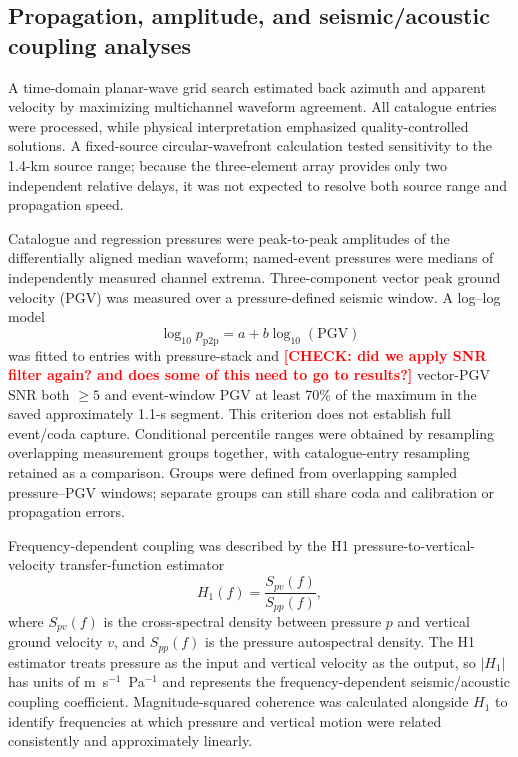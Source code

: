 \documentclass[]{seismica}
\newcommand{\checkme}[1]{\textcolor{red}{\textbf{[CHECK: #1]}}}
\begin{document}
\subsection{Propagation, amplitude, and seismic/acoustic coupling analyses}

A time-domain planar-wave grid search estimated back azimuth and apparent
velocity by maximizing multichannel waveform agreement. All catalogue entries
were processed, while physical interpretation emphasized quality-controlled
solutions. A fixed-source circular-wavefront calculation tested sensitivity to
the 1.4-km source range; because the three-element array provides only two
independent relative delays, it was not expected to resolve both source range
and propagation speed.

Catalogue and regression pressures were peak-to-peak amplitudes of the
differentially aligned median waveform; named-event pressures were medians
of independently measured channel extrema. Three-component vector peak ground
velocity (PGV) was measured over a pressure-defined seismic window. A log--log model
\begin{equation}
 \log_{10}p_{\mathrm{p2p}}=a+b\log_{10}(\mathrm{PGV})
 \label{eq:power_law}
\end{equation}
was fitted to entries with pressure-stack and \checkme{did we apply SNR filter again? and does some of this need to go to results?}
vector-PGV SNR both $\geq5$
and event-window PGV at least 70\% of the maximum in the saved approximately
1.1-s segment. This criterion does not establish full event/coda capture. Conditional percentile ranges were obtained by
resampling overlapping measurement groups together, with catalogue-entry
resampling retained as a comparison. Groups were defined from overlapping
sampled pressure--PGV windows; separate groups can still share coda and
calibration or propagation errors.

Frequency-dependent coupling was described by the H1
pressure-to-vertical-velocity transfer-function estimator
\begin{equation}
 H_1(f)=\frac{S_{pv}(f)}{S_{pp}(f)},
 \label{eq:h1_transfer}
\end{equation}
where $S_{pv}(f)$ is the cross-spectral density between pressure $p$ and
vertical ground velocity $v$, and $S_{pp}(f)$ is the pressure autospectral
density. The H1 estimator treats pressure as the input and vertical velocity
as the output, so $|H_1|$ has units of m~s$^{-1}$~Pa$^{-1}$ and represents
the frequency-dependent seismic/acoustic coupling coefficient. Magnitude-squared
coherence was calculated alongside $H_1$ to identify frequencies at which
pressure and vertical motion were related consistently and approximately
linearly.
\end{document}
